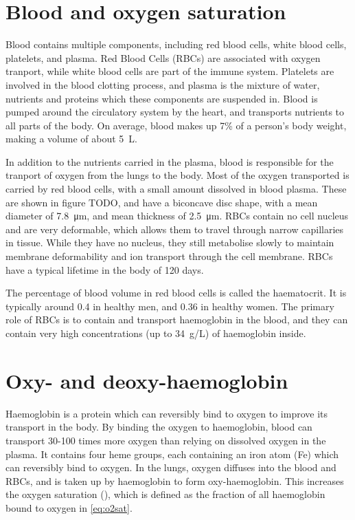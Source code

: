 \section{Blood and oxygen saturation}

Blood contains multiple components, including red blood cells, white blood cells, platelets, and plasma.
Red Blood Cells (RBCs) are associated with oxygen tranport, while white blood cells are part of the immune system.
Platelets are involved in the blood clotting process, and plasma is the mixture of water, nutrients and proteins which these components are suspended in.
Blood is pumped around the circulatory system by the heart, and transports nutrients to all parts of the body.
On average, blood makes up 7\% of a person's body weight, making a volume of about \SI{5}{L}.

In addition to the nutrients carried in the plasma,  blood is responsible for the tranport of oxygen from the lungs to the body.
Most of the oxygen transported is carried by red blood cells, with a small amount dissolved in blood plasma.
These are shown in figure TODO, and have a biconcave disc shape, with a mean diameter of \SI{7.8}{\micro\metre}, and mean thickness of \SI{2.5}{\micro\metre}.
RBCs contain no cell nucleus and are very deformable, which allows them to travel through narrow capillaries in tissue.
While they have no nucleus, they still metabolise slowly to maintain membrane deformability and ion transport through the cell membrane.
RBCs have a typical lifetime in the body of 120 days.

The percentage of blood volume in red blood cells is called the haematocrit.
It is typically around 0.4 in healthy men, and 0.36 in healthy women.
The primary role of RBCs is to contain and transport haemoglobin in the blood, and they can contain very high concentrations (up to \SI{34}{g/L}) of haemoglobin inside.

\section{Oxy- and deoxy-haemoglobin}
Haemoglobin is a protein which can reversibly bind to oxygen to improve  its transport in the body. \cite{HallGuytonHallTextbook2015}
By binding the oxygen to haemoglobin, blood can transport 30-100 times more oxygen than relying on dissolved oxygen in the plasma.
It contains four heme groups, each containing an iron atom (Fe) which can reversibly bind to oxygen.
In the lungs, oxygen diffuses into the blood and RBCs, and is taken up by haemoglobin to form oxy-haemoglobin.
This increases the oxygen saturation (\SOtwo), which is defined as the fraction of all haemoglobin bound to oxygen in \autoref{eq:o2sat}.

